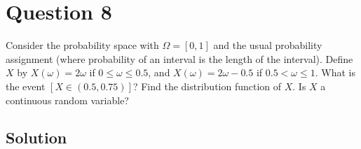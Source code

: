 \section*{Question 8}

Consider the probability space with \( \Omega=[0,1] \) and the usual probability assignment (where probability of an interval is the length of the interval).
Define \( X \) by \( X(\omega)=2 \omega \) if \( 0 \leq \omega \leq 0.5 \), and \( X(\omega)=2 \omega-0.5 \) if \( 0.5<\omega \leq 1 \).
What is the event \( [X \in(0.5,0.75)] \)?
Find the distribution function of \( X \).
Is \( X \) a continuous random variable?

\subsection*{Solution}
